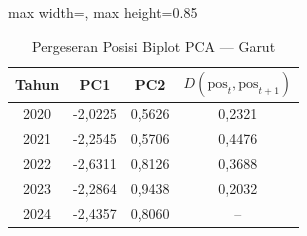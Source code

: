 \begin{table}[H]
\centering
\caption{Pergeseran Posisi Biplot PCA --- Garut} \label{tab:appjarak_pca_skor_garut}
\begin{adjustbox}{max width=\textwidth, max height=0.85\textheight}
\begin{tabular}{|c|c|c|c|}
\hline
\textbf{Tahun} & \textbf{PC1} & \textbf{PC2} & \textbf{$D(\text{pos}_t, \text{pos}_{t+1})$} \\
\hline
2020 & -2,0225 & 0,5626 & 0,2321 \\
2021 & -2,2545 & 0,5706 & 0,4476 \\
2022 & -2,6311 & 0,8126 & 0,3688 \\
2023 & -2,2864 & 0,9438 & 0,2032 \\
2024 & -2,4357 & 0,8060 & -- \\
\hline
\end{tabular}
\end{adjustbox}
\end{table}